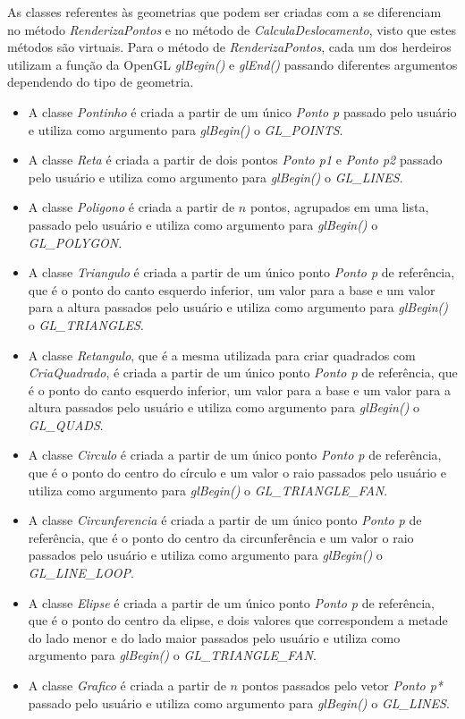 As classes referentes às geometrias que podem ser criadas com a \playAPC{} se diferenciam no método \emph{RenderizaPontos} e no método de \emph{CalculaDeslocamento}, visto que estes métodos são virtuais. Para o método de \emph{RenderizaPontos}, cada um dos herdeiros utilizam a função da OpenGL \emph{glBegin()} e \emph{glEnd()} passando diferentes argumentos dependendo do tipo de geometria.
\begin{itemize}
  \item A classe \emph{Pontinho} é criada a partir de um único \emph{Ponto p} passado pelo usuário e utiliza como argumento para \emph{glBegin()} o \emph{GL\_POINTS}.
  \item A classe \emph{Reta} é criada a partir de dois pontos \emph{Ponto p1} e \emph{Ponto p2} passado pelo usuário e utiliza como argumento para \emph{glBegin()} o \emph{GL\_LINES}.
  \item A classe \emph{Poligono} é criada a partir de $n$ pontos, agrupados em uma lista, passado pelo usuário e utiliza como argumento para \emph{glBegin()} o \emph{GL\_POLYGON}.
  \item A classe \emph{Triangulo} é criada a partir de um único ponto \emph{Ponto p} de referência, que é o ponto do canto esquerdo inferior, um valor para a base e um valor para a altura passados pelo usuário e utiliza como argumento para \emph{glBegin()} o \emph{GL\_TRIANGLES}.
  \item A classe \emph{Retangulo}, que é a mesma utilizada para criar quadrados com \emph{CriaQuadrado}, é criada a partir de um único ponto \emph{Ponto p} de referência, que é o ponto do canto esquerdo inferior, um valor para a base e um valor para a altura passados pelo usuário e utiliza como argumento para \emph{glBegin()} o \emph{GL\_QUADS}.
  \item A classe \emph{Circulo} é criada a partir de um único ponto \emph{Ponto p} de referência, que é o ponto do centro do círculo e um valor o raio passados pelo usuário e utiliza como argumento para \emph{glBegin()} o \emph{GL\_TRIANGLE\_FAN}. 
  \item A classe \emph{Circunferencia} é criada a partir de um único ponto \emph{Ponto p} de referência, que é o ponto do centro da circunferência e um valor o raio passados pelo usuário e utiliza como argumento para \emph{glBegin()} o \emph{GL\_LINE\_LOOP}. 
  \item A classe \emph{Elipse} é criada a partir de um único ponto \emph{Ponto p} de referência, que é o ponto do centro da elipse, e dois valores que correspondem a metade do lado menor e do lado maior passados pelo usuário e utiliza como argumento para \emph{glBegin()} o \emph{GL\_TRIANGLE\_FAN}.
  \item A classe \emph{Grafico} é criada a partir de $n$ pontos passados pelo vetor \emph{Ponto p*} passado pelo usuário e utiliza como argumento para \emph{glBegin()} o \emph{GL\_LINES}. 
\end{itemize}
